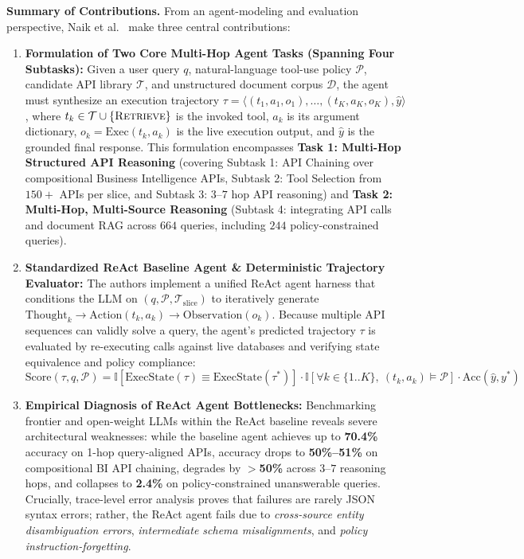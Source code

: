 \documentclass[10pt]{article}
\begin{document}
\textbf{Summary of Contributions.}
From an agent-modeling and evaluation perspective, Naik et al.\ \cite{naik2026vakra} make three central contributions:
\begin{enumerate}
    \item \textbf{Formulation of Two Core Multi-Hop Agent Tasks (Spanning Four Subtasks):} Given a user query $q$, natural-language tool-use policy $\mathcal{P}$, candidate API library $\mathcal{T}$, and unstructured document corpus $\mathcal{D}$, the agent must synthesize an execution trajectory $\tau = \langle (t_1, a_1, o_1), \dots, (t_K, a_K, o_K), \hat{y} \rangle$, where $t_k \in \mathcal{T} \cup \{\textsc{Retrieve}\}$ is the invoked tool, $a_k$ is its argument dictionary, $o_k = \text{Exec}(t_k, a_k)$ is the live execution output, and $\hat{y}$ is the grounded final response. This formulation encompasses \textbf{Task 1: Multi-Hop Structured API Reasoning} (covering Subtask 1: API Chaining over compositional Business Intelligence APIs, Subtask 2: Tool Selection from $150+$ APIs per slice, and Subtask 3: $3\text{--}7$ hop API reasoning) and \textbf{Task 2: Multi-Hop, Multi-Source Reasoning} (Subtask 4: integrating API calls and document RAG across $664$ queries, including $244$ policy-constrained queries).
    \item \textbf{Standardized ReAct Baseline Agent \& Deterministic Trajectory Evaluator:} The authors implement a unified ReAct agent harness that conditions the LLM on $(q, \mathcal{P}, \mathcal{T}_{\text{slice}})$ to iteratively generate $\text{Thought}_k \rightarrow \text{Action}(t_k, a_k) \rightarrow \text{Observation}(o_k)$. Because multiple API sequences can validly solve a query, the agent's predicted trajectory $\tau$ is evaluated by re-executing calls against live databases and verifying state equivalence and policy compliance:
    \begin{equation}
        \text{Score}(\tau, q, \mathcal{P}) = \mathbb{I}\!\left[\text{ExecState}(\tau) \equiv \text{ExecState}(\tau^*)\right] \cdot \mathbb{I}\!\left[\forall k \in \{1..K\},\ (t_k, a_k) \models \mathcal{P}\right] \cdot \text{Acc}(\hat{y}, y^*)
    \end{equation}
    \item \textbf{Empirical Diagnosis of ReAct Agent Bottlenecks:} Benchmarking frontier and open-weight LLMs within the ReAct baseline reveals severe architectural weaknesses: while the baseline agent achieves up to \textbf{70.4\%} accuracy on 1-hop query-aligned APIs, accuracy drops to \textbf{50\%--51\%} on compositional BI API chaining, degrades by \textbf{$>$50\%} across $3\text{--}7$ reasoning hops, and collapses to \textbf{2.4\%} on policy-constrained unanswerable queries. Crucially, trace-level error analysis proves that failures are rarely JSON syntax errors; rather, the ReAct agent fails due to \textit{cross-source entity disambiguation errors}, \textit{intermediate schema misalignments}, and \textit{policy instruction-forgetting}.
\end{enumerate}
\end{document}
